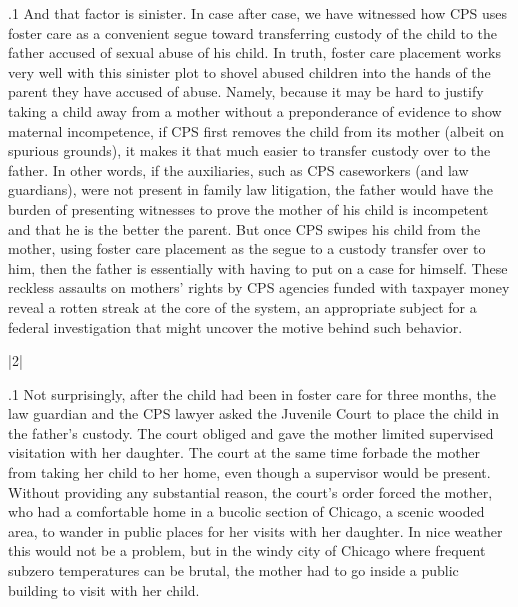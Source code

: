 \documentclass[11pt, twoside]{article}
\begin{document}
{\p.1{%
And that factor is sinister. In case after case, we have witnessed how
CPS uses foster care as a convenient segue toward transferring custody of the child to the father accused of sexual abuse of his child. In
truth, foster care placement works very well with this sinister plot to
shovel abused children into the hands of the parent they have accused
of abuse. Namely, because it may be hard to justify taking a child away
from a mother without a preponderance of evidence to show maternal
incompetence, if CPS first removes the child from its mother (albeit on
spurious grounds), it makes it that much easier to transfer custody over
to the father. In other words, if the auxiliaries, such as CPS caseworkers (and law
guardians), were not present in family law litigation, the father would
have the burden of presenting witnesses to prove the mother of his child
is incompetent and that he is the better the parent. But once CPS swipes
his child from the mother, using foster care placement as the segue to a
custody transfer over to him, then the father is essentially 
with having to put on a case for himself. These reckless assaults on mothers' rights by CPS agencies \mdash{} funded with taxpayer money \mdash{} reveal a
rotten streak at the core of the system, an appropriate subject for a federal
investigation that might uncover the motive behind such behavior.
}%


\s|2|{ }

\p.1{%
\noindent{}Not surprisingly, after the child had been in foster care for three months,
the law guardian and the CPS lawyer asked the Juvenile Court to place
the child in the father's custody. The court obliged and gave the mother
limited supervised visitation with her daughter. The court at the same
time forbade the mother from taking her child to her home, even though
a supervisor would be present. Without providing any substantial reason, the court's order forced the mother, who had a comfortable home in
a bucolic section of Chicago, a scenic wooded area, to wander in public
places for her visits with her daughter. In nice weather this would not
be a problem, but in the windy city of Chicago where frequent subzero
temperatures can be brutal, the mother had to go inside a public building
to visit with her child.
}%

}
\end{document}
